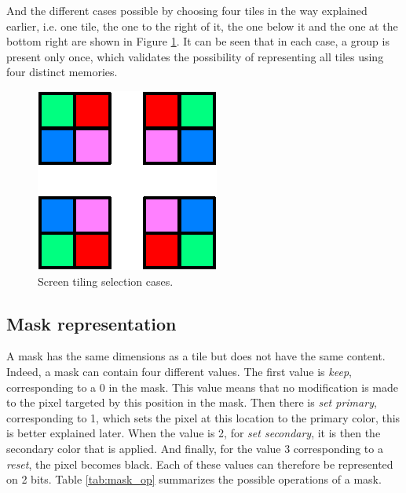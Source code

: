 And the different cases possible by choosing four tiles in the way explained earlier, i.e. one 
tile, the one to the right of it, the one below it and the one at the bottom right are shown in
Figure \ref{fig:gpu/screen_tiling_cases}. It can be seen that in each case, a group is present only 
once, which validates the possibility of representing all tiles using four distinct memories.

\begin{figure}[H]
    \centering
    \includegraphics[scale=1.0]{Chapter4-GPU_CLKU/res/screen_tiling_cases}
    \caption{Screen tiling selection cases.}
    \label{fig:gpu/screen_tiling_cases}
\end{figure}

\subsection{Mask representation}

A mask has the same dimensions as a tile but does not have the same content. Indeed, a mask can 
contain four different values. The first value is \textit{keep}, corresponding to a 0 in the mask. This 
value means that no modification is made to the pixel targeted by this position in the 
mask. Then there is \textit{set primary}, corresponding to 1, which sets the pixel at this 
location to the primary color, this is better explained later. When the value is 2, 
for \textit{set secondary}, it is then the secondary color that is applied. And 
finally, for the value 3 corresponding to a \textit{reset}, the pixel becomes black. Each of these 
values can therefore be represented on 2 bits. Table \ref{tab:mask_op} summarizes the possible 
operations of a mask.


